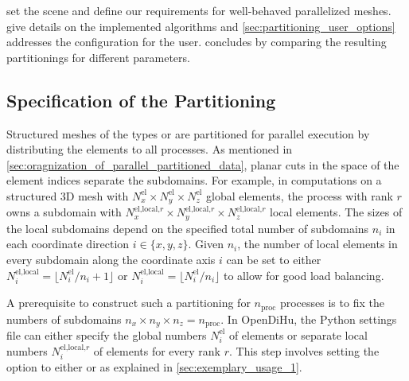  set the scene and define our requirements for well-behaved parallelized meshes.  give details on the implemented algorithms and \cref{sec:partitioning_user_options} addresses the configuration for the user.  concludes by comparing the resulting partitionings for different parameters.


\subsection{Specification of the Partitioning}\label{sec:algorithm_for_partitioning_and_sampling}

Structured meshes of the types  or  are partitioned for parallel execution by distributing the elements to all processes. As mentioned in \cref{sec:oragnization_of_parallel_partitioned_data}, planar cuts in the space of the element indices separate the subdomains. For example, in computations on a structured 3D mesh with $N_x^\text{el} \times N_y^\text{el} \times N_z^\text{el}$ global elements, the process with rank $r$ owns a subdomain with
$N_x^{\text{el,local,}r} \times N_y^{\text{el,local,}r} \times N_z^{\text{el,local,}r}$ local elements.
The sizes of the local subdomains depend on the specified total number of subdomains $n_i$ in each coordinate direction $i \in \{x,y,z\}$.
Given $n_i$, the number of local elements in every subdomain along the coordinate axis $i$ can be set to either $N_i^{\text{el,local}} = \lfloor N^\text{el}_i/n_i+1\rfloor$ or $N_i^{\text{el,local}} = \lfloor N^\text{el}_i/n_i \rfloor$ to allow for good load balancing.

A prerequisite to construct such a partitioning for $n_\text{proc}$ processes is to fix the numbers of subdomains $n_x \times n_y \times n_z = n_\text{proc}$. In OpenDiHu, the Python settings file can either specify the global numbers $N_i^\text{el}$ of elements or separate local numbers $N_i^{\text{el,local,}r}$ of elements for every rank $r$. This step involves setting the option  to either  or  as explained in \cref{sec:exemplary_usage_1}.

